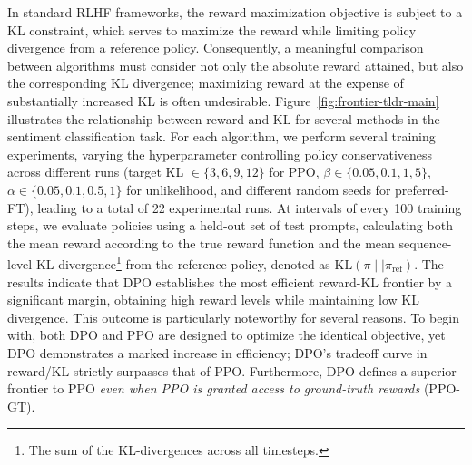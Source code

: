 In standard RLHF frameworks, the reward maximization objective is subject to a KL constraint, which serves to maximize the reward while limiting policy divergence from a reference policy. Consequently, a meaningful comparison between algorithms must consider not only the absolute reward attained, but also the corresponding KL divergence; maximizing reward at the expense of substantially increased KL is often undesirable. Figure~\ref{fig:frontier-tldr-main} illustrates the relationship between reward and KL for several methods in the sentiment classification task. For each algorithm, we perform several training experiments, varying the hyperparameter controlling policy conservativeness across different runs (target KL $\in\{3,6,9,12\}$ for PPO, $\beta \in \{0.05,0.1,1,5\}$, $\alpha\in\{0.05,0.1,0.5,1\}$ for unlikelihood, and different random seeds for preferred-FT), leading to a total of 22 experimental runs. At intervals of every 100 training steps, we evaluate policies using a held-out set of test prompts, calculating both the mean reward according to the true reward function and the mean sequence-level KL divergence\footnote{The sum of the KL-divergences across all timesteps.} from the reference policy, denoted as $\text{KL}\left(\pi\mid \mid \pi_\text{ref}\right)$. The results indicate that DPO establishes the most efficient reward-KL frontier by a significant margin, obtaining high reward levels while maintaining low KL divergence. This outcome is particularly noteworthy for several reasons. To begin with, both DPO and PPO are designed to optimize the identical objective, yet DPO demonstrates a marked increase in efficiency; DPO's tradeoff curve in reward/KL strictly surpasses that of PPO. Furthermore, DPO defines a superior frontier to PPO \emph{even when PPO is granted access to ground-truth rewards} (PPO-GT).

